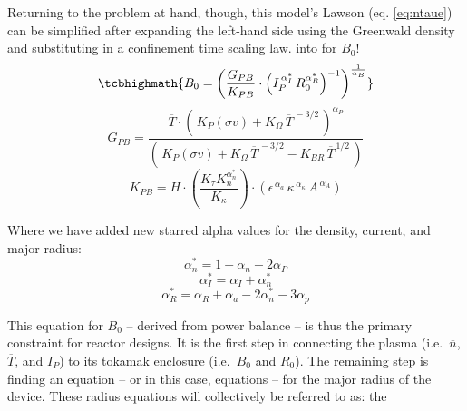 Returning to the problem at hand, though, this model's Lawson  (eq. \ref{eq:ntaue}) can be simplified after expanding the left-hand side using the Greenwald density and substituting in a confinement time scaling law.  into  for $B_0$!
\begin{equation}
	\label{eq:b_0_power}
	\tcbhighmath{
	B_0 = \left( \frac{ G_{PB} }{ K_{PB} } \cdot \left( I_P^{\,\alpha_I^*} \, R_0^{ \alpha_R^* } \right)^{-1} \right) ^ { \frac{1}{ \alpha_B } }
	}
\end{equation}
\begin{equation}
	G_{PB} = \frac{ \overline{T} \cdot \left( \, K_P (\sigma v) + K_\Omega  \, \overline{T}^{  \,-3/2 } \, \right) ^ { \alpha_P } }{ \left( \, K_P (\sigma v) + K_\Omega  \, \overline{T}^{  \,-3/2 } - K_{BR} \, \overline{T}^{  \,1/2 } \, \right) }
\end{equation}
\begin{equation}
	K_{PB} = H \cdot \left( \frac{ K_\tau K_n^{\alpha_n^*}}{K_\kappa } \right) \cdot \left( 
     \epsilon^{\,\alpha_a} \, \kappa^{\,\alpha_\kappa} \, A^{\,\alpha_A}\right)
\end{equation}

Where we have added new starred alpha values for the density, current, and major radius:
\begin{equation}
  \alpha_n^* = 1 + \alpha_n - 2 \alpha_P
\end{equation}
\begin{equation}
  \alpha_I^* = \alpha_I + \alpha_n^*
\end{equation}
\begin{equation}
  \alpha_R^* = \alpha_R + \alpha_a - 2  \alpha_n^* - 3 \alpha_p
\end{equation}


This equation for $B_0$ -- derived from power balance -- is thus the primary constraint for reactor designs. It is the first step in connecting the plasma (i.e.\ $\overline n$, $\overline T$, and $I_P$) to its tokamak enclosure (i.e.\ $B_0$ and $R_0$). The remaining step is finding an equation -- or in this case, equations -- for the major radius of the device. These radius equations will collectively be referred to as: the 

